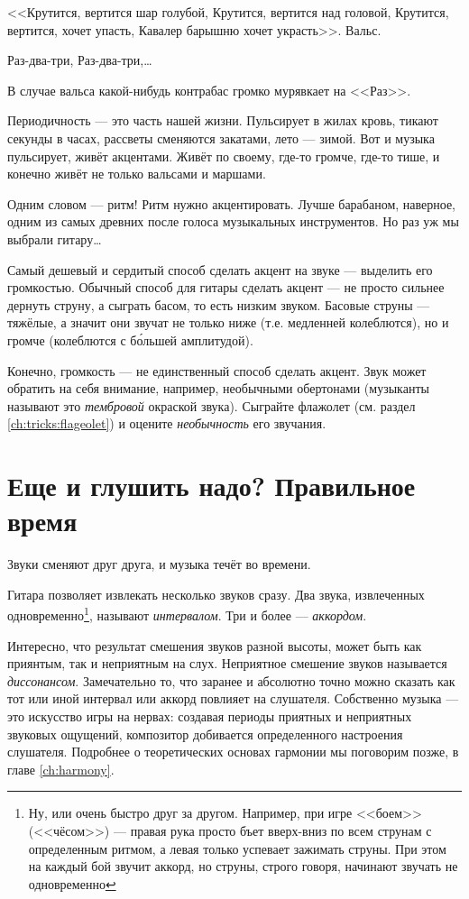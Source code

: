 <<Крутится, вертится шар голубой, Крутится, вертится над головой, Крутится, вертится, хочет упасть, Кавалер барышню хочет украсть>>. Вальс. 
\begin{center}
    Раз-два-три, Раз-два-три,\ldots 
\end{center}
В случае вальса какой-нибудь контрабас громко мурявкает на <<Раз>>.

Периодичность --- это часть нашей жизни. Пульсирует в жилах кровь, тикают секунды в часах, рассветы сменяются закатами, лето --- зимой. Вот и музыка пульсирует, живёт акцентами. Живёт по своему, где-то громче, где-то тише, и конечно живёт не только вальсами и маршами.

Одним словом --- ритм! Ритм нужно акцентировать. Лучше барабаном, наверное, одним из самых древних после голоса музыкальных инструментов. Но раз уж мы выбрали гитару\ldots

Самый дешевый и сердитый способ сделать акцент на звуке --- выделить его громкостью. Обычный способ для гитары сделать акцент --- не просто сильнее дернуть струну, а сыграть басом, то есть низким звуком. Басовые струны --- тяжёлые, а значит они звучат не только ниже (т.е. медленней колеблются), но и громче (колеблются с б\'{о}льшей амплитудой).

Конечно, громкость --- не единственный способ сделать акцент. Звук может обратить на себя внимание, например, необычными обертонами (музыканты называют это \emph{тембровой} окраской звука). Сыграйте флажолет (см. раздел \ref{ch:tricks:flageolet}) и оцените \emph{необычность} его звучания.


\section{Еще и глушить надо? Правильное время}
\label{ch:music:rythm}

Звуки сменяют друг друга, и музыка течёт во времени. 

Гитара позволяет извлекать несколько звуков сразу. Два звука, извлеченных одновременно\footnote{Ну, или очень быстро друг за другом. Например, при игре <<боем>> (<<чёсом>>) --- правая рука просто бъет вверх-вниз по всем струнам с определенным ритмом, а левая только успевает зажимать струны. При этом на каждый бой звучит аккорд, но струны, строго говоря, начинают звучать не одновременно}, называют \emph{интервалом}. Три и более --- \emph{аккордом}.

Интересно, что результат смешения звуков разной высоты, может быть как приянтым, так и неприятным на слух. Неприятное смешение звуков называется \emph{диссонансом}. Замечательно то, что заранее и абсолютно точно можно сказать как тот или иной интервал или аккорд повлияет на слушателя. Собственно музыка --- это искусство игры на нервах: создавая периоды приятных и неприятных звуковых ощущений, композитор добивается определенного настроения слушателя. Подробнее о теоретических основах гармонии мы поговорим позже, в главе \ref{ch:harmony}.

